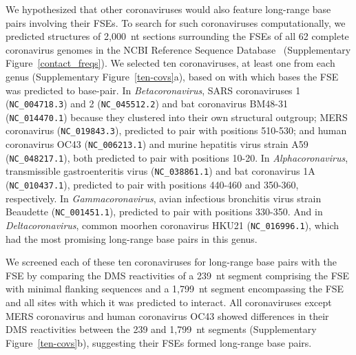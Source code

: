 \documentclass[main.tex]{subfiles}
\begin{document}
We hypothesized that other coronaviruses would also feature long-range base pairs involving their FSEs.
To search for such coronaviruses computationally, we predicted structures of 2,000~nt sections surrounding the FSEs of all 62 complete coronavirus genomes in the NCBI Reference Sequence Database~\cite{OLeary2016} (Supplementary Figure~\ref{contact_freqs}).
We selected ten coronaviruses, at least one from each genus (Supplementary Figure~\ref{ten-covs}a), based on with which bases the FSE was predicted to base-pair.
In \textit{Betacoronavirus}, SARS coronaviruses 1 (\verb|NC_004718.3|) and 2 (\verb|NC_045512.2|) and bat coronavirus BM48-31 (\verb|NC_014470.1|) because they clustered into their own structural outgroup; MERS coronavirus (\verb|NC_019843.3|), predicted to pair with positions 510-530; and human coronavirus OC43 (\verb|NC_006213.1|) and murine hepatitis virus strain A59 (\verb|NC_048217.1|), both predicted to pair with positions 10-20.
In \textit{Alphacoronavirus}, transmissible gastroenteritis virus (\verb|NC_038861.1|) and bat coronavirus 1A (\verb|NC_010437.1|), predicted to pair with positions 440-460 and 350-360, respectively.
In \textit{Gammacoronavirus}, avian infectious bronchitis virus strain Beaudette (\verb|NC_001451.1|), predicted to pair with positions 330-350.
And in \textit{Deltacoronavirus}, common moorhen coronavirus HKU21 (\verb|NC_016996.1|), which had the most promising long-range base pairs in this genus.

We screened each of these ten coronaviruses for long-range base pairs with the FSE by comparing the DMS reactivities of a 239~nt segment comprising the FSE with minimal flanking sequences and a 1,799~nt segment encompassing the FSE and all sites with which it was predicted to interact.
All coronaviruses except MERS coronavirus and human coronavirus OC43 showed differences in their DMS reactivities between the 239 and 1,799~nt segments (Supplementary Figure~\ref{ten-covs}b), suggesting their FSEs formed long-range base pairs.
\end{document}
